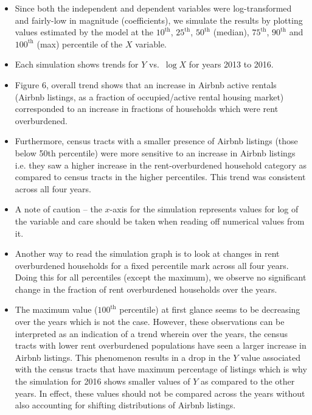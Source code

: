 \documentclass[10pt,letterpaper,onecolumn]{article}
\begin{document}
\begin{itemize}
\item Since both the independent and dependent variables were log-transformed and fairly-low in magnitude (coefficients), we
simulate the results by plotting values estimated by the model at the
\(10^\text{th}\), \(25^\text{th}\), \(50^\text{th}\) (median), \(75^\text{th}\), \(90^\text{th}\) and \(100^\text{th}\) (max) percentile of the
\(X\) variable.

\item Each simulation shows trends for \(Y\) vs.\ \(\log X\) for years 2013 to 2016.

\item Figure 6, overall trend shows that an increase in Airbnb active
rentals (Airbnb listings, as a fraction of occupied/active rental
housing market) corresponded to an increase in fractions of households
which were rent overburdened.

\item Furthermore, census tracts with a smaller presence of Airbnb listings
(those below 50th percentile) were more sensitive to an increase in
Airbnb listings i.e. they saw a higher increase in the
rent-overburdened household category as compared to census tracts in
the higher percentiles. This trend was consistent across all four
years.

\item A note of caution -- the \(x\)-axis for the simulation represents values
for log of the variable and care should be taken when reading off
numerical values from it.

\item Another way to read the simulation graph is to look at changes in rent
overburdened households for a fixed percentile mark across all four
years. Doing this for all percentiles (except the maximum), we observe
no significant change in the fraction of rent overburdened households
over the years.

\item The maximum value (\(100^\text{th}\) percentile) at first glance seems to be
decreasing over the years which is not the case.
However, these observations can be interpreted as an indication of a
trend wherein over the years, the census tracts with lower rent
overburdened populations have seen a larger increase in Airbnb
listings. This phenomenon results in a drop in the \(Y\) value associated
with the census tracts that have maximum percentage of listings which
is why the simulation for 2016 shows smaller values of \(Y\) as compared
to the other years. In effect, these values should not be compared
across the years without also accounting for shifting distributions of
Airbnb listings.
\end{itemize}
\end{document}
